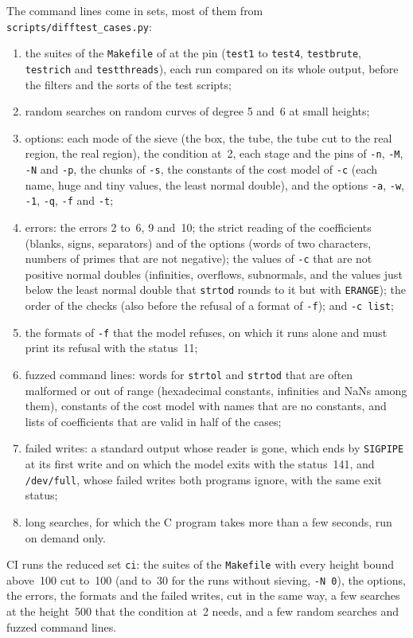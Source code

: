 The command lines come in sets, most of them from \verb|scripts/difftest_cases.py|:
\begin{enumerate}
  \item the suites of the \verb|Makefile| of \jpoints{} at the pin (\verb|test1| to \verb|test4|,
    \verb|testbrute|, \verb|testrich| and \verb|testthreads|), each run compared on its whole
    output, before the filters and the sorts of the test scripts;
  \item random searches on random curves of degree 5 and~6 at small heights;
  \item options: each mode of the sieve (the box, the tube, the tube cut to the real region, the
    real region), the condition at~2, each stage and the pins of \verb|-n|, \verb|-M|, \verb|-N| and
    \verb|-p|, the chunks of \verb|-s|, the constants of the cost model of \verb|-c| (each name,
    huge and tiny values, the least normal double), and the options \verb|-a|, \verb|-w|,
    \verb|-1|, \verb|-q|, \verb|-f| and \verb|-t|;
  \item errors: the errors 2 to~6, 9 and~10; the strict reading of the coefficients (blanks,
    signs, separators) and of the options (words of two characters, numbers of primes that are not
    negative); the values of \verb|-c| that are not positive normal doubles (infinities, overflows,
    subnormals, and the values just below the least normal double that \verb|strtod| rounds to it
    but with \verb|ERANGE|); the order of the checks (also before the refusal of a format of
    \verb|-f|); and \verb|-c list|;
  \item the formats of \verb|-f| that the model refuses, on which it runs alone and must print its
    refusal with the status~11;
  \item fuzzed command lines: words for \verb|strtol| and \verb|strtod| that are often malformed or
    out of range (hexadecimal constants, infinities and NaNs among them), constants of the cost
    model with names that are no constants, and lists of coefficients that are valid in half of the
    cases;
  \item failed writes: a standard output whose reader is gone, which ends \jpoints{} by
    \verb|SIGPIPE| at its first write and on which the model exits with the status~141, and
    \verb|/dev/full|, whose failed writes both programs ignore, with the same exit status;
  \item long searches, for which the C program takes more than a few seconds, run on demand only.
\end{enumerate}
CI runs the reduced set \verb|ci|: the suites of the \verb|Makefile| with every height bound
above~100 cut to~100 (and to~30 for the runs without sieving, \verb|-N 0|), the options, the
errors, the formats and the failed writes, cut in the same way, a few searches at the height~500
that the condition at~2 needs, and a few random searches and fuzzed command lines.

